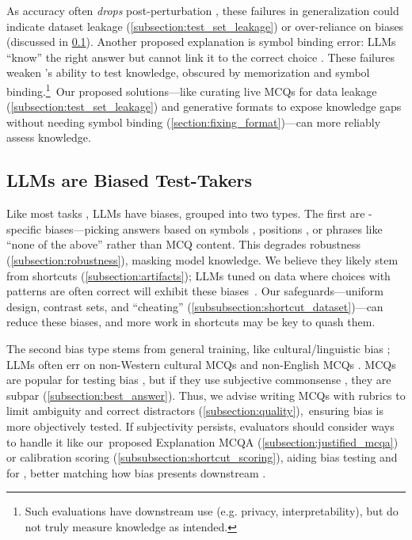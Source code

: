 As accuracy often \textit{drops} post-perturbation \cite{zhou-etal-2024-revisiting}, these failures in generalization could indicate dataset leakage (\cref{subsection:test_set_leakage}) or over-reliance on biases (discussed in \cref{subsection:bias}).
Another proposed explanation is symbol binding error: LLMs ``know'' the right answer but cannot link it to the correct choice \cite{Wiegreffe2024AnswerAA, xue2024strengthened}.
These failures weaken \mcqa's ability to test knowledge, obscured by memorization and symbol binding.\footnote{Such evaluations have downstream use (e.g. privacy, interpretability), but do not truly measure knowledge as intended.}~Our proposed solutions---like curating live MCQs for data leakage (\cref{subsection:test_set_leakage}) and generative \mcqa formats to expose knowledge gaps without needing symbol binding (\cref{section:fixing_format})---can more reliably assess knowledge.


\subsection{LLMs are Biased \mcqa Test-Takers} \label{subsection:bias}

Like most  tasks \cite{chu2024fairness}, LLMs have \mcqa biases, grouped into two types.
%
%
The first are \mcqa-specific biases---picking answers based on symbols \cite{Zheng2023LargeLM}, positions \cite{Li2024CanMQ,
wei-etal-2024-unveiling}, or phrases like ``none of the
above'' \cite{xu2024llms, wang2025llms} rather than MCQ content.
This degrades robustness
(\cref{subsection:robustness}), masking model knowledge.
%
We believe they likely stem from shortcuts (\cref{subsection:artifacts});
%
LLMs tuned on data where choices with patterns are often
correct will exhibit these biases~\cite{pacchiardi2024leaving}.
%
Our safeguards---uniform design, contrast sets,
and ``cheating'' (\cref{subsubsection:shortcut_dataset})---can
reduce these biases, and more work in shortcuts may be key
to quash them.

The second bias type stems from general training, like cultural/linguistic bias \cite{myung2024blend, li2023land};
LLMs often err on non-Western cultural MCQs \cite{Acquaye2024SusuBO, azime2024proverbeval} and non-English MCQs \cite{son2024kmmlu, li2023cmmlu}.
MCQs are popular for testing bias \cite{guo2023evaluating}, but if they use subjective commonsense \cite{seo-etal-2024-kocommongen}, they are subpar (\cref{subsection:best_answer}).
Thus, we advise writing MCQs with rubrics to limit ambiguity and correct distractors (\cref{subsection:quality}),~ensuring bias is more objectively tested.
If subjectivity persists, evaluators should consider ways to handle it like our~proposed Explanation MCQA (\cref{subsection:justified_mcqa}) or calibration scoring (\cref{subsubsection:shortcut_scoring}), aiding bias testing and for \emcqa, better matching how bias presents downstream \cite{seshadri2025does}.

